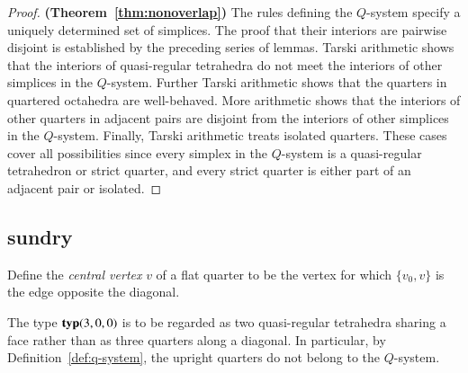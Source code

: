 \begin{proof} {\bf (Theorem~\ref{thm:nonoverlap})}
The rules defining the $Q$-system specify a uniquely determined
set of simplices.  The proof that their interiors are pairwise
disjoint is established by the preceding series of lemmas.
Tarski arithmetic shows that the interiors of
quasi-regular tetrahedra do not meet the interiors of other
simplices in the $Q$-system. Further Tarski 
arithmetic shows that
the quarters in quartered octahedra are well-behaved.
More arithmetic shows that the interiors of other
quarters in adjacent pairs are disjoint from the interiors of
other simplices in the $Q$-system. Finally, 
Tarski arithmetic treats isolated
quarters. These cases cover all
possibilities since every simplex in the $Q$-system is a
quasi-regular tetrahedron or strict quarter, and every strict
quarter is either part of an adjacent pair or isolated.
\end{proof}



\subsection{sundry}



\begin{definition}
Define the {\it central vertex\/} $v$ of a flat quarter to be the
vertex for which $\{v_0,v\}$ is the edge opposite the diagonal.
\end{definition}

The type ${\operatorname{\bf typ}}{(3,0,0)}$ is to be regarded as two
quasi-regular tetrahedra sharing a face rather than as three
quarters along a diagonal.  In particular, by
Definition~\ref{def:q-system}, the upright quarters do not belong
to the $Q$-system.




